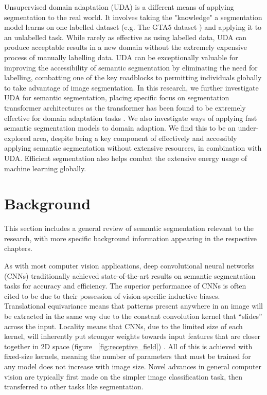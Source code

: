 \documentclass[a4paper,12pt]{report}
\begin{document}
Unsupervised domain adaptation (UDA) is a different means of applying segmentation to the real world. It involves taking the "knowledge" a segmentation model learns on one labelled dataset (e.g. The GTA5 dataset \cite{richter_playing_2016}) and applying it to an unlabelled task. While rarely as effective as using labelled data, UDA can produce acceptable results in a new domain without the extremely expensive process of manually labelling data. UDA can be exceptionally valuable for improving the accessibility of semantic segmentation by eliminating the need for labelling, combatting one of the key roadblocks to permitting individuals globally to take advantage of image segmentation. In this research, we further investigate UDA for semantic segmentation, placing specific focus on segmentation transformer architectures as the transformer has been found to be extremely effective for domain adaptation tasks \cite{yang_tvt_2021} \cite{xu_cdtrans_2021} \cite{hoyer_daformer_2022}. We also investigate ways of applying fast semantic segmentation models to domain adaption. We find this to be an under-explored area, despite being a key component of effectively and accessibly applying semantic segmentation without extensive resources, in combination with UDA. Efficient segmentation also helps combat the extensive energy usage of machine learning globally.


\section{Background}
This section includes a general review of semantic segmentation relevant to the research, with more specific background information appearing in the respective chapters.

As with most computer vision applications, deep convolutional neural networks (CNNs) traditionally achieved state-of-the-art results on semantic segmentation tasks for accuracy and efficiency. The superior performance of CNNs is often cited to be due to their possession of vision-specific inductive biases. Translational equivariance means that patterns present anywhere in an image will be extracted in the same way due to the constant convolution kernel that “slides” across the input. Locality means that CNNs, due to the limited size of each kernel, will inherently put stronger weights towards input features that are closer together in 2D space (figure ~\ref{fig:receptive_field}) \cite{zhang_dive_2019}. All of this is achieved with fixed-size kernels, meaning the number of parameters that must be trained for any model does not increase with image size. Novel advances in general computer vision are typically first made on the simpler image classification task, then transferred to other tasks like segmentation.
\end{document}
